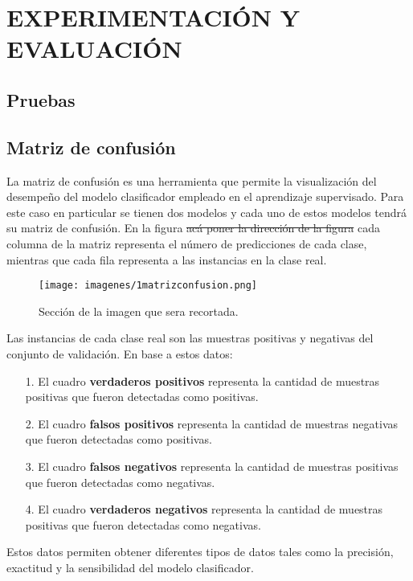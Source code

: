 \chapter{EXPERIMENTACIÓN Y EVALUACIÓN}

\section{Pruebas}

\section{Matriz de confusión}

\noindent La matriz de confusión es una herramienta que permite la visualización del desempeño del modelo clasificador empleado en el aprendizaje supervisado. Para este caso en particular se tienen dos modelos y cada uno de estos modelos tendrá su matriz de confusión. En la figura \sout{acá poner la dirección de la figura} cada columna de la matriz representa el número de predicciones de cada clase, mientras que cada fila representa a las instancias en la clase real.

\begin{figure}[H]
\centering
{\texttt{[image: imagenes/1matrizconfusion.png]}}
\caption{Sección de la imagen que sera recortada.}
\label{fig:sectorRecorte}
\end{figure}

Las instancias de cada clase real son las muestras positivas y negativas del conjunto de validación. En base a estos datos:
\begin{itemize}
\item[1. ] El cuadro \textbf{verdaderos positivos} representa la cantidad de muestras positivas que fueron detectadas como positivas.
\item[2. ] El cuadro \textbf{falsos positivos} representa la cantidad de muestras negativas que fueron detectadas como positivas.
\item[3. ] El cuadro \textbf{falsos negativos} representa la cantidad de muestras positivas que fueron detectadas como negativas.
\item[4. ] El cuadro \textbf{verdaderos negativos} representa la cantidad de muestras positivas que fueron detectadas como negativas.
\end{itemize}

\noindent Estos datos permiten obtener diferentes tipos de datos tales como la precisión, exactitud y la sensibilidad del modelo clasificador.

